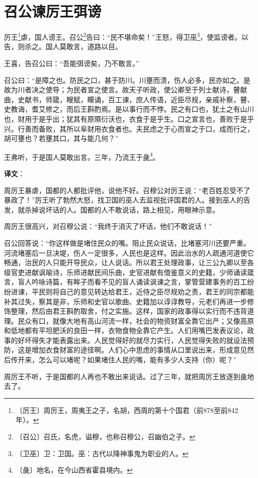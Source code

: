 \documentclass[12pt,UTF-8,openany]{ctexbook}
\begin{document}
\chapter{召公谏厉王弭谤}

\begin{normalsize}
    
    厉王\footnote{〔厉王〕周厉王，周夷王之子，名胡，西周的第十个国君（前878至前842年）。}虐，国人谤王。召公\footnote{〔召公〕召氏，名虎，谥穆，也称召穆公，召幽伯之子。}告曰：“民不堪命矣！”王怒，得卫巫\footnote{〔卫巫〕卫：卫国。巫：古代以降神事鬼为职业的人。}，使监谤者。以告，则杀之。国人莫敢言，道路以目。
    
    王喜，告召公曰：“吾能弭谤矣，乃不敢言。”
    
    召公曰：“是障之也。防民之口，甚于防川。川壅而溃，伤人必多，民亦如之。是故为川者决之使导；为民者宣之使言。故天子听政，使公卿至于列士献诗，瞽献曲，史献书，师箴，瞍赋，矇诵，百工谏，庶人传语，近臣尽规，亲戚补察，瞽、史教诲，耆艾修之，而后王斟酌焉。是以事行而不悖。民之有口也，犹土之有山川也，财用于是乎出；犹其有原隰衍沃也，衣食于是乎生。口之宣言也，善败于是乎兴。行善而备败，其所以阜财用衣食者也。夫民虑之于心而宣之于口，成而行之，胡可壅也？若壅其口，其与能几何？”
    
    王弗听，于是国人莫敢出言。三年，乃流王于彘\footnote{〔彘〕地名，在今山西省霍县境内。}。
\end{normalsize}


\newpage

\textbf{译文}：

\vspace{1em}

\begin{normalsize}
    
    周厉王暴虐，国都的人都批评他，说他不好。召穆公对厉王说：“老百姓忍受不了暴政了！”厉王听了勃然大怒，找卫国的巫人去监视批评国君的人。接到巫人的告发，就杀掉说坏话的人。国都的人不敢说话，路上相见，用眼神示意。
    
    周厉王很高兴，对召穆公说：“我终于消灭了坏话，他们不敢说话！”
    
    召公回答说：“你这样做是堵住民众的嘴。阻止民众说话，比堵塞河川还要严重。河流堵塞后一旦决堤，伤人一定很多，人民也是这样。因此治水的人疏通河道使它畅通，治民的人只能开导民众，让人说话。所以君王处理政事，让三公九卿以至各级官吏进献讽喻诗，乐师进献民间乐曲，史官进献有借鉴意义的史籍，少师诵读箴言，盲人吟咏诗篇，有眸子而看不见的盲人诵读讽谏之言，掌管营建事务的百工纷纷进谏，平民则将自己的意见转达给君王，近侍之臣尽规劝之责，君王的同宗都能补其过失，察其是非，乐师和史官以歌曲、史籍加以谆谆教导，元老们再进一步修饰整理，然后由君王斟酌取舍，付之实施。这样，国家的政事得以实行而不违背道理。民众有口，就像大地有高山河流一样，社会的物资财富全靠它出产；又像高原和低地都有平坦肥沃的良田一样，衣物食物全靠它产生。人们用嘴巴发表议论，政事的好坏得失才能表露出来。人民觉得好的就尽力实行，人民觉得失败的就设法预防，这是增加衣食财富的途径啊。人们心中思虑的事情从口里说出来，形成意见然后传开来，怎么可以堵呢？如果堵住人民的嘴，能有多少人支持（你）呢？”
    
    周厉王不听，于是国都的人再也不敢出来说话。过了三年，就把周厉王放逐到彘地去了。
    
\end{normalsize}
\end{document}

